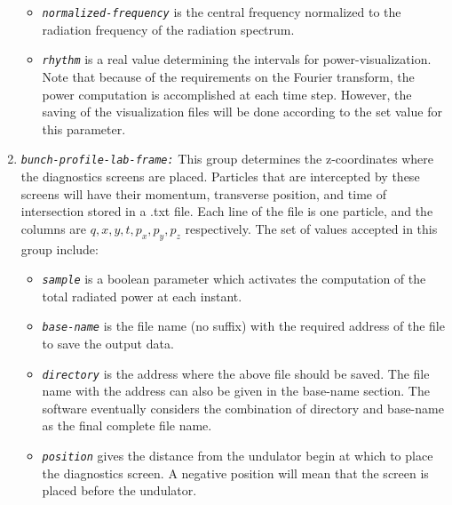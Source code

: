 \begin{enumerate}
\begin{itemize}
	\item {\tt \small \em normalized-frequency} is the central frequency normalized to the radiation frequency of the radiation spectrum.
	\item {\tt \small \em rhythm} is a real value determining the intervals for power-visualization. Note that because of the requirements on the Fourier transform, the power computation is accomplished at each time step. However, the saving of the visualization files will be done according to the set value for this parameter.
\end{itemize}
%
\item {\tt \small \em bunch-profile-lab-frame:} This group determines the z-coordinates where the diagnostics screens are placed. Particles that are intercepted by these screens will have their momentum, transverse position, and time of intersection stored in a .txt file. Each line of the file is one particle, and the columns are $q, x, y, t, p_x, p_y, p_z$ respectively.
%
The set of values accepted in this group include:
%
\begin{itemize}
	\item {\tt \small \em sample} is a boolean parameter which activates the computation of the total radiated power at each instant.
	\item {\tt \small \em base-name} is the file name (no suffix) with the required address of the file to save the output data.
	\item {\tt \small \em directory} is the address where the above file should be saved. The file name with the address can also be given in the base-name section. The software eventually considers the combination of directory and base-name as the final complete file name.
	\item {\tt \small \em position} gives the distance from the undulator begin at which to place the diagnostics screen. A negative position will mean that the screen is placed before the undulator.
\end{itemize}
%
\end{enumerate}

